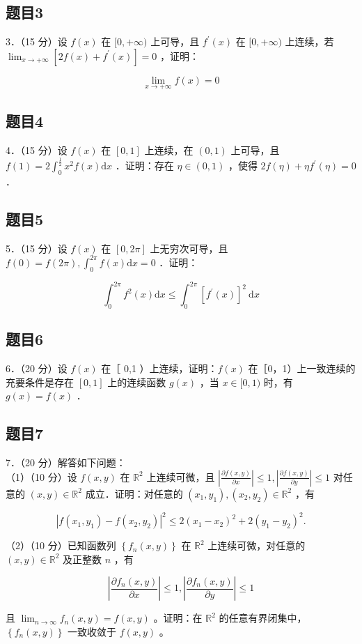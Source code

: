 \documentclass{article}
\begin{document}
\subsection{题目3}
3．（15 分）设 \(f(x)\) 在 \([0,+\infty)\) 上可导，且 \(f^{\prime}(x)\) 在 \([0,+\infty)\) 上连续，若 \(\lim _{x \rightarrow+\infty}\left[2 f(x)+f^{\prime}(x)\right]=0\) ，证明：

\[
\lim _{x \rightarrow+\infty} f(x)=0
\]

\subsection{题目4}
4．（15 分）设 \(f(x)\) 在 \([0,1]\) 上连续，在 \((0,1)\) 上可导，且 \(f(1)=2 \int_{0}^{\frac{1}{2}} x^{2} f(x) \mathrm{d} x\) ．证明：存在 \(\eta \in(0,1)\) ，使得 \(2 f(\eta)+\eta f^{\prime}(\eta)=0\) ．

\subsection{题目5}
5．（15 分）设 \(f(x)\) 在 \([0,2 \pi]\) 上无穷次可导，且 \(f(0)=f(2 \pi), \int_{0}^{2 \pi} f(x) \mathrm{d} x=0\) ．证明：

\[
\int_{0}^{2 \pi} f^{2}(x) \mathrm{d} x \leq \int_{0}^{2 \pi}\left[f^{\prime}(x)\right]^{2} \mathrm{~d} x
\]

\subsection{题目6}
6．（20 分）设 \(f(x)\) 在［ 0,1 ）上连续，证明：\(f(x)\) 在［0，1）上一致连续的充要条件是存在 \([0,1]\) 上的连续函数 \(g(x)\) ，当 \(x \in[0,1)\) 时，有 \(g(x)=f(x)\) ．

\subsection{题目7}
7．（20 分）解答如下问题：\\
（1）（10 分）设 \(f(x, y)\) 在 \(\mathbb{R}^{2}\) 上连续可微，且 \(\left|\frac{\partial f(x, y)}{\partial x}\right| \leq 1,\left|\frac{\partial f(x, y)}{\partial y}\right| \leq 1\) 对任意的 \((x, y) \in \mathbb{R}^{2}\) 成立．证明：对任意的 \(\left(x_{1}, y_{1}\right),\left(x_{2}, y_{2}\right) \in \mathbb{R}^{2}\) ，有

\[
\left|f\left(x_{1}, y_{1}\right)-f\left(x_{2}, y_{2}\right)\right|^{2} \leq 2\left(x_{1}-x_{2}\right)^{2}+2\left(y_{1}-y_{2}\right)^{2} .
\]

（2）（10 分）已知函数列 \(\left\{f_{n}(x, y)\right\}\) 在 \(\mathbb{R}^{2}\) 上连续可微，对任意的 \((x, y) \in \mathbb{R}^{2}\) 及正整数 \(n\) ，有

\[
\left|\frac{\partial f_{n}(x, y)}{\partial x}\right| \leq 1,\left|\frac{\partial f_{n}(x, y)}{\partial y}\right| \leq 1
\]

且 \(\lim _{n \rightarrow \infty} f_{n}(x, y)=f(x, y)\) 。证明：在 \(\mathbb{R}^{2}\) 的任意有界闭集中，\(\left\{f_{n}(x, y)\right\}\) 一致收敛于 \(f(x, y)\) 。
\end{document}
